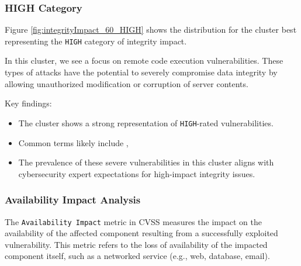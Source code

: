 \documentclass[12pt]{article}
\begin{document}
\subsubsection*{HIGH Category}

Figure \ref{fig:integrityImpact_60_HIGH} shows the distribution for the cluster best representing the \texttt{HIGH} category of integrity impact.


In this cluster, we see a focus on remote code execution vulnerabilities. These
types of attacks have the potential to severely compromise data integrity by allowing unauthorized
modification or corruption of server contents.

Key findings:
\begin{itemize}

	\item The cluster shows a strong representation of \texttt{HIGH}-rated vulnerabilities.

	\item Common terms likely include , 

	\item The prevalence of these severe vulnerabilities in this cluster aligns with cybersecurity
	      expert expectations for high-impact integrity issues.

\end{itemize}

\subsubsection{Availability Impact Analysis}

The \texttt{Availability Impact} metric in CVSS measures the impact on the availability of the
affected component resulting from a successfully exploited vulnerability. This metric refers to the
loss of availability of the impacted component itself, such as a networked service (e.g., web,
database, email).
\end{document}
